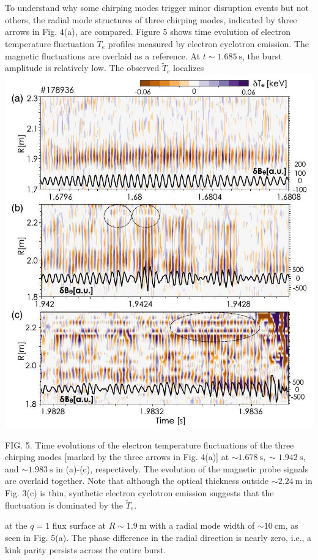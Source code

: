 \documentclass[10pt]{article}
\begin{document}
To understand why some chirping modes trigger minor disruption events but not others, the radial mode structures of three chirping modes, indicated by three arrows in Fig. 4(a), are compared. Figure 5 shows time evolution of electron temperature fluctuation $\tilde{T}_{e}$ profiles measured by electron cyclotron emission. The magnetic fluctuations are overlaid as a reference. At $t \sim 1.685 \mathrm{~s}$, the burst amplitude is relatively low. The observed $\tilde{T}_{e}$ localizes
\includegraphics[max width=\textwidth, center]{2023_06_19_f8dbb752866ca158c73eg-4}

FIG. 5. Time evolutions of the electron temperature fluctuations of the three chirping modes [marked by the three arrows in Fig. 4(a)] at $\sim 1.678 \mathrm{~s}, \sim 1.942 \mathrm{~s}$, and $\sim 1.983 \mathrm{~s}$ in (a)-(c), respectively. The evolution of the magnetic probe signals are overlaid together. Note that although the optical thickness outside $\sim 2.24 \mathrm{~m}$ in Fig. 3(c) is thin, synthetic electron cyclotron emission suggests that the fluctuation is dominated by the $\tilde{T}_{e}$.

at the $q=1$ flux surface at $R \sim 1.9 \mathrm{~m}$ with a radial mode width of $\sim 10 \mathrm{~cm}$, as seen in Fig. 5(a). The phase difference in the radial direction is nearly zero, i.e., a kink parity persists across the entire burst.
\end{document}
